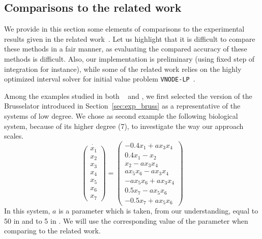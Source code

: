 \documentclass{sig-alternate-05-2015}
\newcommand\ForAuthors[1]%
 {\par\smallskip                     %
  \begin{center}%
   \fbox%
   {\parbox{0.9\linewidth}%
    {\raggedright\sc--- #1}%
   }%
  \end{center}%
  \par\smallskip                     %
 }
\begin{document}
\subsection{Comparisons to the related work}
\label{sec:exp_compar}
We provide in this section some elements of comparisons to the experimental results given in the related work~\cite{Underapproxflowpipes,underapprox16}.
Let us highlight that it is difficult to compare these methods in a fair manner, as evaluating the compared accuracy of these methods is difficult. 
Also, our implementation is preliminary (using fixed step of integration for instance), while some of the related work relies on the highly optimized 
interval solver for initial value problem {\tt VNODE-LP}~\cite{VNODELP}. 


Among the examples studied in both ~\cite{Underapproxflowpipes} and \cite{underapprox16}, we first selected
the version of the Brusselator introduced in Section~\ref{sec:exp_bruss} as a representative of the systems of low degree. 
We chose as second example the following biological system, because of its higher degree (7), to investigate the way our approach scales. 
\begin{equation}
\dot{\left(\begin{array}{c}
x_1 \\
x_2 \\
x_3 \\
x_4 \\
x_5 \\
x_6 \\
x_7
\end{array}\right)} = \left(\begin{array}{c}
-0.4x_1+ a x_3x_4 \\
0.4x_1-x_2 \\
x_2- a x_3x_4 \\
a x_5x_6- a x_3x_4 \\
- a x_5x_6+ a x_3x_4 \\
0.5x_7- a x_5x_6 \\
-0.5x_7+ a x_5x_6
\end{array}\right)
\end{equation}
In this system, $a$ is a parameter which is taken, from our understanding, equal to 50 in \cite{Underapproxflowpipes} and to 5 in \cite{underapprox16}. 
We will use the corresponding value of the parameter when comparing to the related work.
\end{document}

